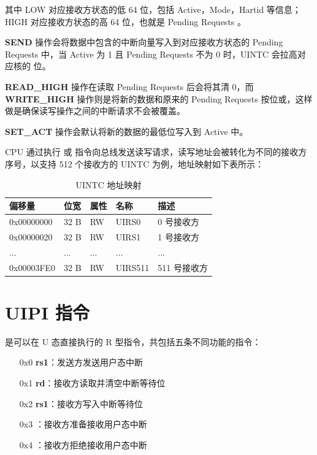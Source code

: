 其中 LOW 对应接收方状态的低 64 位，包括 Active，Mode，Hartid 等信息；HIGH 对应接收方状态的高 64 位，也就是 Pending Requests 。

\textbf{SEND} 操作会将数据中包含的中断向量写入到对应接收方状态的 Pending Requests 中，当 Active 为 1 且 Pending Requests 不为 0 时，UINTC 会拉高对应核的 \FcsrUipUsip 位。

\textbf{READ\_HIGH} 操作在读取 Pending Requests 后会将其清 0，而 \textbf{WRITE\_HIGH} 操作则是将新的数据和原来的 Pending Requests 按位或，这样做是确保读写操作之间的中断请求不会被覆盖。

\textbf{SET\_ACT} 操作会默认将新的数据的最低位写入到 Active 中。

CPU 通过执行 \Isd 或 \Ild 指令向总线发送读写请求，读写地址会被转化为不同的接收方序号，以支持 512 个接收方的 UINTC 为例，地址映射如下表所示：

\begin{table}
    \centering
    \begin{threeparttable}[c]
        \begin{tabular}{|l|l|l|l|l|}
            \hline
            偏移量 & 位宽 & 属性 & 名称 & 描述 \\
            \hline
            0x00000000 & 32 B & RW & UIRS0 & 0 号接收方 \\
            \hline
            0x00000020 & 32 B & RW & UIRS1 & 1 号接收方 \\
            \hline
            ... & ... & ... & ... & ... \\
            \hline
            0x00003FE0 & 32 B & RW & UIRS511 & 511 号接收方 \\
            \hline
        \end{tabular}
        \caption{UINTC 地址映射}
        \label{tab:uintc2}
    \end{threeparttable}
\end{table}

\section{UIPI 指令}

\Iuipi 是可以在 U 态直接执行的 R 型指令，共包括五条不同功能的指令：

\begin{itemize}
    \item[0x0] \textbf{\Iuipisend rs1}：发送方发送用户态中断
    \item[0x1] \textbf{\Iuipiread rd}：接收方读取并清空中断等待位
    \item[0x2] \textbf{\Iuipiwrite rs1}：接收方写入中断等待位
    \item[0x3] \textbf{\Iuipiact}：接收方准备接收用户态中断
    \item[0x4] \textbf{\Iuipideact}：接收方拒绝接收用户态中断
\end{itemize}

